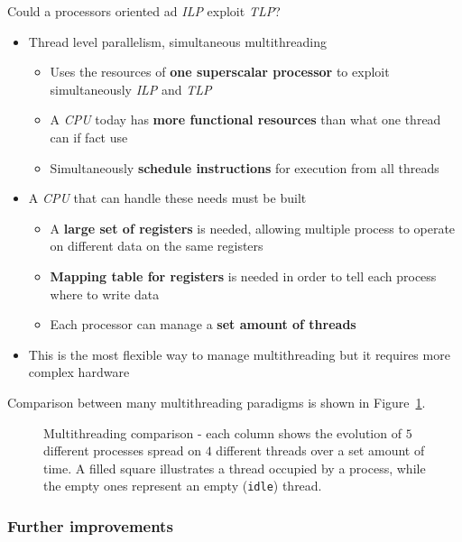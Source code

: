 \documentclass[english]{article}
\begin{document}
\bigskip
Could a processors oriented ad \textit{ILP} exploit \textit{TLP}?

\begin{itemize}
  \item Thread level parallelism, simultaneous multithreading
        \begin{itemize}
          \item Uses the resources of \textbf{one superscalar processor} to exploit simultaneously \textit{ILP} and \textit{TLP}
          \item A \textit{CPU} today has \textbf{more functional resources} than what one thread can if fact use
          \item Simultaneously \textbf{schedule instructions} for execution from all threads
        \end{itemize}
  \item A \textit{CPU} that can handle these needs must be built
        \begin{itemize}
          \item A \textbf{large set of registers} is needed, allowing multiple process to operate on different data on the same registers
          \item \textbf{Mapping table for registers} is needed in order to tell each process where to write data
          \item Each processor can manage a \textbf{set amount of threads}
        \end{itemize}
  \item This is the most flexible way to manage multithreading but it requires more complex hardware
\end{itemize}
\bigskip

Comparison between many multithreading paradigms is shown in Figure~\ref{fig:multithreading-comparison}.

\begin{figure}[htbp]
  \bigskip
  \centering
  \caption{\centering Multithreading comparison - each column shows the evolution of \(5\) different processes spread on \(4\) different threads over a set amount of time.
    A filled square illustrates a thread occupied by a process, while the empty ones represent an empty (\texttt{idle}) thread.}
  \label{fig:multithreading-comparison}
  \bigskip
\end{figure}

\subsubsection{Further improvements}
\end{document}
